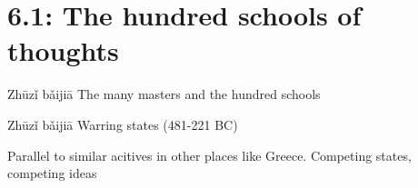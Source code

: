 \documentclass{report}
\begin{document}
\section{6.1: The hundred schools of thoughts}
Zhūzǐ bǎijiā
The many masters and the hundred schools



Zhūzǐ bǎijiā
Warring states (481-221 BC)


Parallel to similar acitives in other places like Greece.
Competing states, competing ideas
\end{document}
